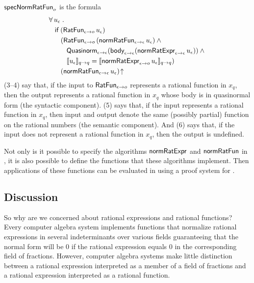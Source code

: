 \documentclass[fleqn]{llncs}
\begin{document}
$\mbox{\sf specNormRatFun}_o$ is the formula
\begin{align}\setcounter{equation}{0}
&
\ForallApp u_\epsilon \mdot\\
& \hspace*{2ex}
\If \; (\mname{RatFun}_{\epsilon \tarrow o} \, u_\epsilon)\\
& \hspace*{4ex}
(\mname{RatFun}_{\epsilon \tarrow o} \, (\mname{normRatFun}_{\epsilon \tarrow \epsilon} \, u_\epsilon) \And {}\\
& \hspace*{6ex}
\mname{Quasinorm}_{\epsilon \tarrow \epsilon}(\mname{body}_{\epsilon \tarrow \epsilon}(\mname{normRatExpr}_{\epsilon \tarrow \epsilon} \, u_\epsilon)) \And {}\\
& \hspace*{6ex}
\sembrack{u_\epsilon}_{q \tarrow q} =
\sembrack{\mname{normRatExpr}_{\epsilon \tarrow o} \, u_\epsilon}_{q \tarrow q})\\
& \hspace*{4ex}
(\mname{normRatFun}_{\epsilon \tarrow \epsilon} \, u_\epsilon)\IsUndefApp
\end{align}
(3--4) say that, if the input to $\mbox{\sf RatFun}_{\epsilon \rightarrow o}$
represents a rational function in $x_q$, then the output represents a
rational function in $x_q$ whose body is in quasinormal form (the
syntactic component).  (5) says that, if the input represents a
rational function in $x_q$, then input and output denote the same
(possibly partial) function on the rational numbers (the semantic
component).  And (6) says that, if the input does not represent a
rational function in $x_q$, then the output is undefined.

Not only is it possible to specify the algorithms
$\mbox{\sf normRatExpr}$ and $\mbox{\sf normRatFun}$ in {\churchuqe}, it is
also possible to define the functions that these algorithms implement.
Then applications of these functions can be evaluated in {\churchuqe}
using a proof system for {\churchuqe}.

\subsection{Discussion}

So why are we concerned about rational expressions and rational
functions?  Every computer algebra system implements functions that
normalize rational expressions in several indeterminants over various
fields guaranteeing that the normal form will be 0 if the rational
expression equals 0 in the corresponding field of fractions.  However,
computer algebra systems make little distinction between a rational
expression interpreted as a member of a field of fractions and a
rational expression interpreted as a rational function.
\end{document}
